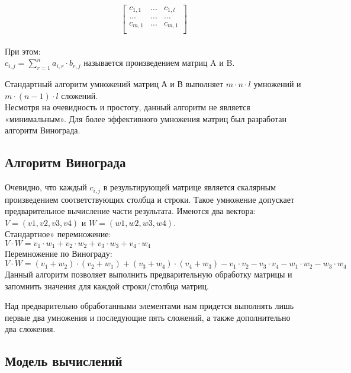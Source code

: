 \documentclass[a4paper, 14pt]{article}
\begin{document}
\[ \begin{bmatrix}
c_{1,1} & ... & c_{1,l} \\
... & ... & ... \\
c_{m,1} & ... & c_{m,1} \\
\end{bmatrix} \]\\

При этом:\\

$c_{i,j} = \sum\limits_{r=1}^n a_{i,r}\cdot b_{r,j}$ называется произведением матриц A и B.

Стандартный алгоритм умножений матриц А и В выполняет $ m \cdot n \cdot l $  умножений и $ m \cdot (n - 1) \cdot l $ сложений.\\

Несмотря на очевидность и простоту, данный алгоритм не является «минимальным». Для более эффективного умножения матриц был разработан алгоритм Винограда.

	\subsection{Алгоритм Винограда}
	
Очевидно, что каждый $c_{i,j}$ в результирующей матрице является скалярным произведением соответствующих столбца и строки. Такое умножение допускает предварительное вычисление части результата.
Имеются два вектора: $V = (v1, v2, v3, v4)$  и $W = (w1, w2, w3, w4)$.\\

Стандартное» перемножение:\\
$ V \cdot W=v_1 \cdot w_1 + v_2 \cdot w_2 + v_3 \cdot w_3 + v_4 \cdot w_4$ \\

Перемножение по Винограду:\\
$V \cdot W=(v_1 + w_2) \cdot (v_2 + w_1) + (v_3 + w_4) \cdot (v_4 + w_3) - v_1 \cdot v_2 - v_3 \cdot v_4 - w_1 \cdot w_2 - w_3 \cdot w_4$\\

	Данный алгоритм позволяет выполнить предварительную обработку матрицы и запомнить значения для каждой строки/столбца матриц. 
	
	Над предварительно обработанными элементами нам придется выполнять лишь первые два умножения и последующие пять сложений, а также дополнительно два сложения. 
	
	\subsection{Модель вычислений}
	
\end{document}
